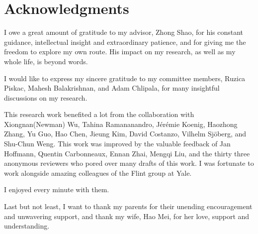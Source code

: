 

\chapter*{Acknowledgments}
\thispagestyle{empty}

I owe a great amount of gratitude to my advisor, Zhong Shao, for
his constant guidance, intellectual insight and extraordinary patience,
and for giving me the freedom to explore my own route.
His impact on my research, as well as my whole life, is beyond words.

I would like to express my sincere gratitude to my committee members,
Ruzica Piskac, Mahesh Balakrishnan, and Adam Chlipala, for many insightful
discussions on my research.

This research work benefited a lot from 
the collaboration with Xiongnan(Newman) Wu,
Tahina Ramananandro,
J\'{e}r\'{e}mie Koenig,
Haozhong Zhang,
Yu Guo,
Hao Chen,
Jieung Kim,
David Costanzo,
Vilhelm Sj\"{o}berg,
and Shu-Chun Weng.
This work was improved by the valuable feedback of 
Jan Hoffmann,
Quentin Carbonneaux,
Ennan Zhai, Mengqi Liu,
and the thirty three anonymous reviewers who pored over many drafts
of this work.
I was fortunate to work alongside 
amazing colleagues of the Flint group at Yale. 
I enjoyed every minute with them.

Last but not least, I want to thank my parents 
for their unending encouragement and unwavering support, 
and thank my wife, Hao Mei,
for her love, support and understanding.

\clearpage
